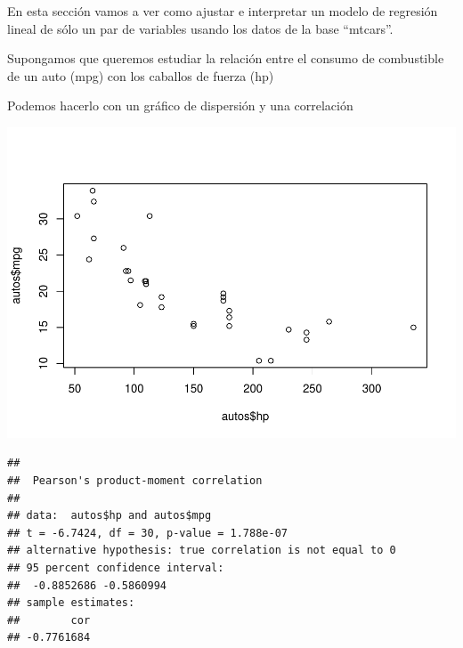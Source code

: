 \documentclass[
]{book}
\newenvironment{Shaded}{\begin{snugshade}}{\end{snugshade}}
\newcommand{\AttributeTok}[1]{\textcolor[rgb]{0.77,0.63,0.00}{#1}}
\newcommand{\FunctionTok}[1]{\textcolor[rgb]{0.00,0.00,0.00}{#1}}
\newcommand{\NormalTok}[1]{#1}
\newcommand{\OtherTok}[1]{\textcolor[rgb]{0.56,0.35,0.01}{#1}}
\newcommand{\SpecialCharTok}[1]{\textcolor[rgb]{0.00,0.00,0.00}{#1}}
\newcommand{\StringTok}[1]{\textcolor[rgb]{0.31,0.60,0.02}{#1}}
\begin{document}
En esta sección vamos a ver como ajustar e interpretar un modelo de regresión lineal de sólo un par de variables usando los datos de la base ``mtcars''.

Supongamos que queremos estudiar la relación entre el consumo de combustible de un auto (mpg) con los caballos de fuerza (hp)

Podemos hacerlo con un gráfico de dispersión y una correlación

\begin{Shaded}
\end{Shaded}

\includegraphics{Esatadistica_en_R_files/figure-latex/unnamed-chunk-224-1.pdf}

\begin{Shaded}
\end{Shaded}

\begin{verbatim}
## 
##  Pearson's product-moment correlation
## 
## data:  autos$hp and autos$mpg
## t = -6.7424, df = 30, p-value = 1.788e-07
## alternative hypothesis: true correlation is not equal to 0
## 95 percent confidence interval:
##  -0.8852686 -0.5860994
## sample estimates:
##        cor 
## -0.7761684
\end{verbatim}
\end{document}
